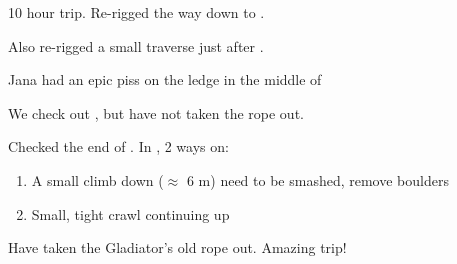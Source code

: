 
10 hour trip. 
Re-rigged the way down to . 

Also re-rigged a small traverse just after .

Jana had an epic piss on the ledge in the middle of  


We check out , but have not taken the rope out.

Checked the end of . In , 2 ways on:

\begin{enumerate}
    \item 
    A small climb down ($\approx$ 6 m) need to be smashed, remove boulders
    \item 
    Small, tight crawl continuing up 
\end{enumerate}

Have taken the Gladiator's old rope out. Amazing trip!
    




